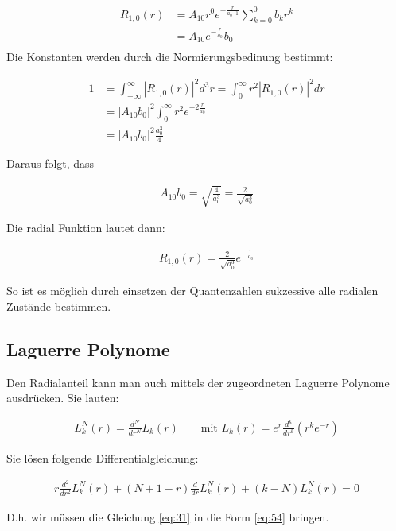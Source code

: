 \begin{align}
  \label{eq:49}
  R_{1,0}(r) &= A_{10}r^{0}e^{-\frac{r}{a_0 \cdot 1}}\sum^{0}_{k=0} b_kr^k\\
&= A_{10}e^{-\frac{r}{a_0 }}b_0\\
\end{align}
Die Konstanten werden durch die Normierungsbedinung bestimmt:

\begin{align}
  \label{eq:50}
  1 &= \int_{-\infty}^{\infty} |R_{1,0}(r)|^2d^3r = \int_{0}^{\infty} r^2 |R_{1,0}(r)|^2 dr\\
&=  |A_{10}b_0|^2 \int_{0}^{\infty} r^2e^{-2\frac{r}{a_0 }}\\
&=  |A_{10}b_0|^2  \frac{a_0^3}{4}
\end{align}

Daraus folgt, dass 

\begin{align}
  \label{eq:51}
  A_{10}b_0 = \sqrt{ \frac{4}{a_0^3}} = \frac{2}{\sqrt{a_0^3}}
\end{align}

Die radial Funktion lautet dann:

\begin{align}
  \label{eq:52}
  R_{1,0}(r)= \frac{2}{\sqrt{a_0^3}} e^{-\frac{r}{a_0 }}
\end{align}

So ist es möglich durch einsetzen der Quantenzahlen sukzessive alle radialen Zustände bestimmen.


\subsection*{Laguerre Polynome}

Den Radialanteil kann man auch mittels der zugeordneten Laguerre Polynome ausdrücken. Sie lauten:

\begin{align}
  \label{eq:53}
  L_k^N (r) = \frac{d^N}{dr^N}L_k(r) \qquad \text{mit  } L_k(r) = e^r\frac{d^k}{dr^k}(r^k e^{-r})
\end{align}

Sie lösen folgende Differentialgleichung:

\begin{align}
  \label{eq:54}
  r\frac{d^2}{dr^2}L^N_k(r) + (N+1-r)\frac{d}{dr}L^N_k(r) + (k-N)L^N_k(r) = 0
\end{align}

D.h. wir müssen die Gleichung \eqref{eq:31} in die Form \eqref{eq:54} bringen.

